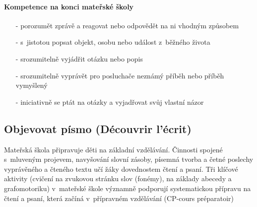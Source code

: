 			\paragraph{Kompetence na konci mateřské školy}
			\begin{itemize}
				\setlength\itemsep{-2mm}
				\item[-] porozumět zprávě a reagovat nebo odpovědět na ni vhodným způsobem
				\item[-] s jistotou popsat objekt, osobu nebo událost z běžného života
				\item[-] srozumitelně vyjádřit otázku nebo popis
				\item[-] srozumitelně vyprávět pro posluchače neznámý příběh nebo příběh vymyšlený 
				\item[-] iniciativně se ptát na otázky a vyjadřovat svůj vlastní názor
			\end{itemize}


		\subsection{Objevovat písmo (Découvrir l'écrit)}
			Mateřská škola připravuje děti na základní vzdělávání. Činnosti spojené s mluveným projevem, navyšování slovní zásoby, písemná tvorba a četné poslechy vyprávěného a čteného textu učí žáky dovednostem čtení a psaní. Tři klíčové aktivity (cvičení na zvukovou stránku slov (fonémy), na základy abecedy a grafomotoriku) v mateřské škole významně podporují systematickou přípravu na čtení a psaní, která začíná v přípravném vzdělávání (CP-cours préparatoir)

